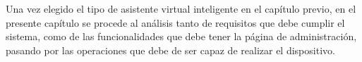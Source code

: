 Una vez elegido el tipo de asistente virtual inteligente en el capítulo previo, en el presente capítulo se procede al análisis tanto de requisitos que debe cumplir el sistema, como de las funcionalidades que debe tener la página de administración, pasando por las operaciones que debe de ser capaz de realizar el dispositivo.